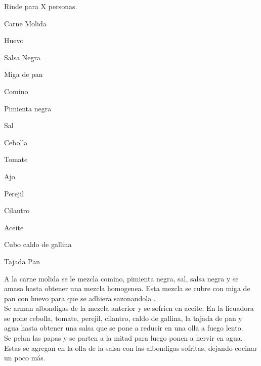 
Rinde para X personas.

\begin{ingredientes}
\item Carne Molida
\item Huevo
\item Salsa Negra
\item Miga de pan
\item Comino
\item Pimienta negra
\item Sal
\item Cebolla
\item Tomate
\item Ajo
\item Perejil
\item Cilantro
\item Aceite
\item Cubo caldo de gallina
\item Tajada Pan
\end{ingredientes}
\preparacion
A la carne molida se le mezcla comino, pimienta negra, sal, salsa negra y se amasa hasta obtener una mezcla homogenea. Esta mezcla se cubre con miga de pan con huevo para que se adhiera sazonandola .\\

Se arman albondigas de la mezcla anterior  y se sofrien en aceite. En la licuadora se pone cebolla, tomate, perejil, cilantro, caldo de gallina, la tajada de pan y agua hasta obtener una salsa que se pone a reducir en una olla a fuego lento.\\

Se pelan las papas y se parten a la mitad para luego ponen a hervir en agua. Estas se agregan en la olla de la salsa con las albondigas sofritas, dejando cocinar un poco más.